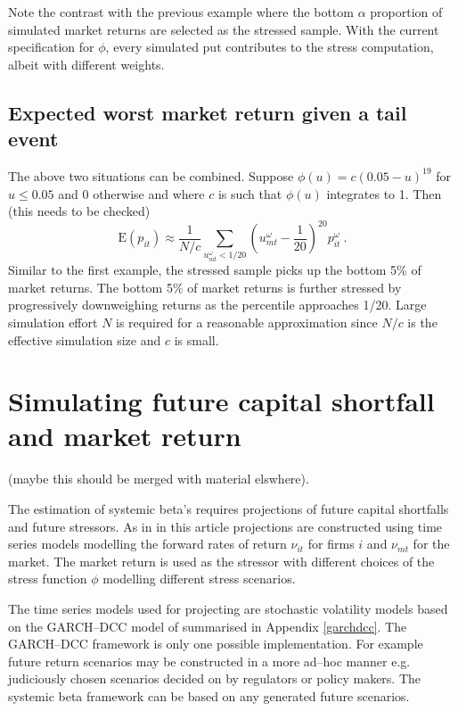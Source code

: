 \documentclass[authoryear]{elsarticle}
\newcommand{\E}{\mathrm{E}}
\renewcommand{\o}{\omega}
\newcommand{\aref}[1]{Appendix \ref{#1}}
\begin{document}
Note the contrast with the previous example where the bottom $\alpha$ proportion of simulated market returns are selected as the stressed sample. With the current specification for $\phi$,   every simulated put contributes to the stress computation, albeit with  different weights.


\subsection{Expected worst market return given a tail event}

The above two situations can be combined.   Suppose  $\phi(u)=c(0.05-u)^{19}$ for $u\le 0.05$ and 0 otherwise and where $c$ is such that $\phi(u)$ integrates to 1.  Then (this needs to be checked)
$$
\E(p_{it}) \approx \frac{1}{N/c}\sum_{u^\o_{mt}<1/20}  \left(u^\o_{mt}-\frac{1}{20}\right)^{20}p_{it}^\o\ .
$$
 Similar to the first example, the stressed sample picks up the bottom 5\% of market returns. The bottom 5\% of market returns is further stressed by  progressively downweighing returns as the percentile approaches 1/20.   Large simulation effort $N$ is required for a reasonable approximation since $N/c$ is the effective simulation size and $c$ is small.

\section{Simulating future capital shortfall and market return}

(maybe this should be merged with material elswhere).

The estimation of systemic beta's requires  projections of future capital shortfalls and future stressors.   As in \cite{brownlees2015} in this article projections are constructed  using time series models modelling the forward rates of return $\nu_{it}$ for firms $i$ and $\nu_{mt}$ for the market.   The market return is used as the stressor with different choices of the stress function $\phi$ modelling different stress scenarios.

The time series models used for projecting are stochastic volatility models based on the GARCH--DCC model of \cite{engle2002dynamic} summarised in \aref{garchdcc}.    The GARCH--DCC framework is only one possible implementation.   For example future return scenarios may be constructed in a more ad--hoc manner e.g. judiciously chosen scenarios decided on by regulators or policy makers.   The  systemic beta framework can be based on  any  generated  future  scenarios.
\end{document}
